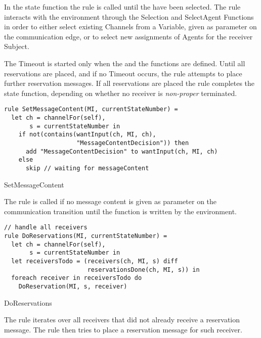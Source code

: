 In the state function the  rule is called until the  have been selected. The  rule interacts with the environment through the Selection and SelectAgent Functions in order to either select existing Channels from a Variable, given as parameter on the communication edge, or to select new assignments of Agents for the receiver Subject.

The Timeout is started only when the  and the  functions are defined. Until all reservations are placed, and if no Timeout occurs, the  rule attempts to place further reservation messages. If all reservations are placed the  rule completes the state function, depending on whether no receiver is \textit{non-proper} terminated.


\begin{listing}[htbp]
\begin{verbatim}
rule SetMessageContent(MI, currentStateNumber) =
  let ch = channelFor(self),
       s = currentStateNumber in
    if not(contains(wantInput(ch, MI, ch),
                    "MessageContentDecision")) then
      add "MessageContentDecision" to wantInput(ch, MI, ch)
    else
      skip // waiting for messageContent
\end{verbatim}
\caption{SetMessageContent}
\label{lst:shortasm:SetMessageContent}
\end{listing}

The  rule is called if no message content is given as parameter on the communication transition until the  function is written by the environment.


\begin{listing}[htbp]
\begin{verbatim}
// handle all receivers
rule DoReservations(MI, currentStateNumber) =
  let ch = channelFor(self),
       s = currentStateNumber in
  let receiversTodo = (receivers(ch, MI, s) diff
                       reservationsDone(ch, MI, s)) in
  foreach receiver in receiversTodo do
    DoReservation(MI, s, receiver)
\end{verbatim}
\caption{DoReservations}
\label{lst:shortasm:DoReservations}
\end{listing}



The  rule iterates over all receivers that did not already receive a reservation message. The  rule then tries to place a reservation message for such receiver.

